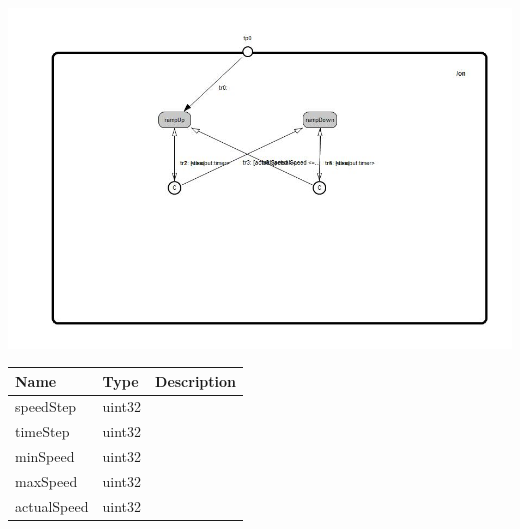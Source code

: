 \begin{par}

\end{par}

{
\centering{}
\includegraphics[width=1.0\textwidth]{./images/AHalGenRampUpDown_on_behavior.jpg}
}

\begin{par}

\end{par}
	

\begin{tabular}[ht]{|l|l|p{8cm}|}
\hline
\textbf{Name} & \textbf{Type} & \textbf{Description}\\
\hline
speedStep & uint32 & \\
\hline
timeStep & uint32 & \\
\hline
minSpeed & uint32 & \\
\hline
maxSpeed & uint32 & \\
\hline
actualSpeed & uint32 & \\
\hline
\end{tabular}


